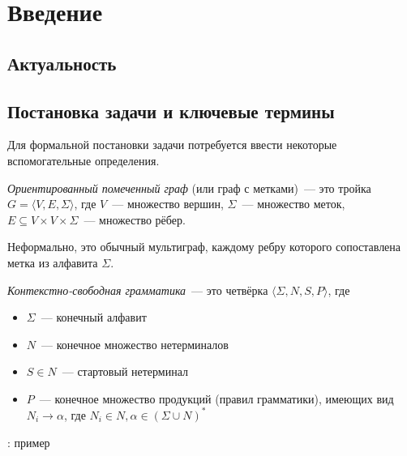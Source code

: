 \section*{Введение}


\subsection*{Актуальность}

\subsection*{Постановка задачи и ключевые термины}

Для формальной постановки задачи потребуется ввести некоторые вспомогательные определения.

\begin{definition}
    \textit{Ориентированный помеченный граф} (или граф с метками)~--- это тройка $G = \langle V, E, \Sigma \rangle$, где $V$~--- множество вершин, $\Sigma$~--- множество меток, $E \subseteq V \times V \times \Sigma$~--- множество рёбер. 

    Неформально, это обычный мультиграф, каждому ребру которого сопоставлена метка из алфавита $\Sigma$.
\end{definition}

\begin{definition}
\textit{Контекстно-свободная грамматика}~--- это четвёрка $\langle \Sigma, N, S, P \rangle$, где
\begin{itemize}
    \item $\Sigma$~--- конечный алфавит
    \item $N$~--- конечное множество нетерминалов
    \item $S \in N$~--- стартовый нетерминал
    \item $P$~--- конечное множество продукций (правил грамматики), имеющих вид\\ $N_i \to \alpha$, где $N_i \in N, \alpha \in (\Sigma \cup N)^{*}$
\end{itemize}
\end{definition}

\begin{example}
\TODO: пример
\end{example}


